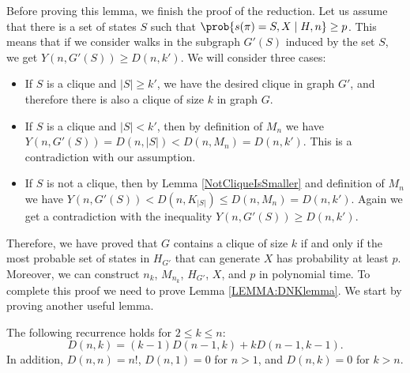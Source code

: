 Before proving this lemma, we finish the proof of the reduction. Let
us assume that there is a set of states $S$ such that
$\prob{s(\pi)=S,X \mid H,n}\ge p$. This means that if we consider walks in the
subgraph $G'(S)$ induced by the set $S$, we get $Y(n,G'(S))\ge
D(n,k')$. We will consider three cases:
\begin{itemize}[itemsep=-1mm]
\item If $S$ is a clique and $|S|\ge k'$, we have the desired clique in 
graph $G'$, and therefore there is also a clique of size $k$ in graph $G$. 
\item If $S$ is a clique and $|S|<k'$, then by definition of $M_n$ we have 
$Y(n,G'(S))=D(n,|S|)<D(n,M_n) = 
D(n,k')$. This is a contradiction with our assumption. 
\item If $S$ is not a clique, then by Lemma \ref{NotCliqueIsSmaller}
  and definition of $M_n$ we have $Y(n,G'(S)) < D(n, K_{|S|}) \le
  D(n,M_n) = D(n,k')$. Again we get a contradiction with 
the inequality $Y(n,G'(S))\ge D(n,k')$.
\end{itemize}
Therefore, we have proved that $G$ contains a clique of size $k$ if and
only if the most probable set of states in $H_{G'}$ that can generate $X$ has
probability at least $p$. Moreover, we can construct $n_k$, $M_{n_k}$,
$H_{G'}$, $X$, and $p$ in polynomial time.
To complete this proof we need to prove Lemma \ref{LEMMA:DNKlemma}.  We
start by proving another useful lemma.

\begin{lemma}\label{RecurenceLemma}
The following recurrence holds for $2\leq k\leq n$:
$$D(n,k)=(k-1) D(n-1,k) + k D(n-1,k-1).$$
In addition, $D(n,n)=n!$, $D(n,1) = 0$ for $n>1$, and $D(n,k) = 0$ for $k>n$.
\end{lemma}


